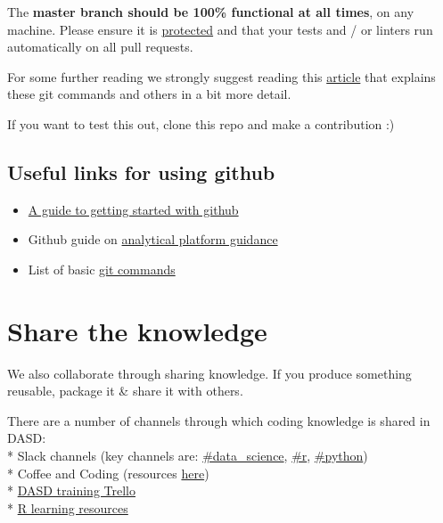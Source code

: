 \documentclass[]{book}
\providecommand{\tightlist}{%
  \setlength{\itemsep}{0pt}\setlength{\parskip}{0pt}}
\begin{document}
The \textbf{master branch should be 100\% functional at all times}, on any machine. Please ensure it is \href{https://help.github.com/articles/about-protected-branches/}{protected} and that your tests and / or linters run automatically on all pull requests.

For some further reading we strongly suggest reading this \href{https://gist.github.com/blackfalcon/8428401}{article} that explains these git commands and others in a bit more detail.

If you want to test this out, clone this repo and make a contribution :)

\hypertarget{gitlink}{%
\subsection*{Useful links for using github}\label{gitlink}}

\begin{itemize}
\tightlist
\item
  \href{https://jennybc.github.io/2014-05-12-ubc/ubc-r/session2.4_github.html}{A guide to getting started with github}\\
\item
  Github guide on \href{https://user-guidance.services.alpha.mojanalytics.xyz/github.html\#creating-your-project-repo-on-github}{analytical platform guidance}\\
\item
  List of basic \href{https://guides.github.com/introduction/git-handbook/}{git commands}
\end{itemize}

\hypertarget{knowledge}{%
\section{Share the knowledge}\label{knowledge}}

We also collaborate through sharing knowledge. If you produce something reusable, package it \& share it with others.

There are a number of channels through which coding knowledge is shared in DASD:\\
* Slack channels (key channels are: \href{https://app.slack.com/client/T1PU1AP6D/C1Z8Q18LS}{\#data\_science}, \href{https://app.slack.com/client/T1PU1AP6D/C1PUCG719}{\#r}, \href{https://app.slack.com/client/T1PU1AP6D/C1Q09V86S}{\#python})\\
* Coffee and Coding (resources \href{https://github.com/moj-analytical-services/Coffee-and-Coding}{here})\\
* \href{https://trello.com/b/zAwm6sCc/dasd-training}{DASD training Trello}\\
* \href{https://docs.google.com/document/d/1R4hBMf26T9HEnCdVz56PpZhwiCv5RhberYL3BxOSKsA/edit}{R learning resources}
\end{document}
